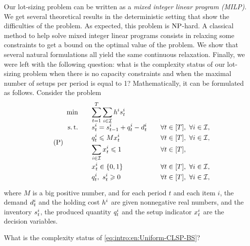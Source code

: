 Our lot-sizing problem can be written as a \emph{mixed integer linear program (MILP)}.
We get several theoretical results in the deterministic setting that show the difficulties of the problem.
As expected, this problem is $\operatorname{NP}$-hard.
A classical method to help solve mixed integer linear programs consists in relaxing some constraints to get a bound on the optimal value of the problem.
We show that several natural formulations all yield the same continuous relaxation.
Finally, we were left with the following question: what is the complexity status of our lot-sizing problem when there is no capacity constraints and when the maximal number of setups per period is equal to 1?
Mathematically, it can be formulated as follows.
Consider the problem
\begin{equation}\tag{P}\label{eq:intro:en:Uniform-CLSP-BS}
  \begin{array}{rlll}
    \min\quad & \ds \sum_{t=1}^{\horizon} \sum_{i\in\REF} \holding^i \inventory_t^i
    \\ \smallskip
    \st\quad & \ds \inventory_t^i = \inventory_{t-1}^i + \quantity_t^i - \demand_t^i && \forall t\in\range{\horizon},\ \forall i\in\REF,
    \\ \smallskip
    & \ds \quantity_t^i \le M\setup_t^i && \forall t\in\range{\horizon},\ \forall i\in\REF,
    \\ \smallskip
    & \ds \sum_{i\in\REF} \setup_t^i \le 1 && \forall t\in\range{\horizon},
    \\ \smallskip
    & \ds \setup_t^i \in \crbracket{0,1} && \forall t\in\range{\horizon},\ \forall i\in\REF,
    \\ \smallskip
    & \ds \quantity_t^i,\ \inventory_t^i \ge 0 && \forall t\in\range{\horizon},\ \forall i\in\REF,
  \end{array}
\end{equation}
where $M$ is a big positive number, and for each period $t$ and each item $i$, the demand $d_t^i$ and the holding cost $h^i$ are given nonnegative real numbers, and the inventory $s_t^i$, the produced quantity $q_t^i$ and the setup indicator $x_t^i$ are the decision variables.
\begin{question}
What is the complexity status of \eqref{eq:intro:en:Uniform-CLSP-BS}?
\end{question}


